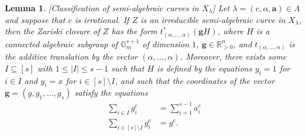 \documentclass[9pt]{amsart}
\theoremstyle{my_theorem_style}
\numberwithin{definition}{section}
\newtheorem{lemma}[definition]{Lemma}
\newcommand{\G}{\mathbb{G}}
\newcommand{\R}{\mathbb{R}}
\renewcommand{\vec}[1]{\bm{#1}}
\begin{document}
\begin{lemma}
\label{lemma/classification_of_semi-algebraic_curves}
    [Classification of semi-algebraic curves in $X_\lambda$]
    Let $\lambda = (c, \alpha, \vec{a}) \in \Lambda$ and suppose that $c$ is irrational. If $Z$ is an irreducible semi-algebraic curve in $X_\lambda$, then the Zariski closure of $Z$ has the form $t_{(\alpha, \dots, \alpha)}^*(\vec{g} H)$, where $H$ is a connected algebraic subgroup of $\G_m^{s + 1}$ of dimension $1$, $\vec{g} \in \R_{>0}^n$, and $t_{(\alpha, \dots, \alpha)}$ is the additive translation by the vector $(\alpha, \dots, \alpha)$. Moreover, there exists some $I \subseteq [s]$ with $1 \leq |I| \leq s - 1$ such that $H$ is defined by the equations $y_i = 1$ for $i \in I$ and $y_i = x$ for $i \in [s] \setminus I$, and such that the coordinates of the vector $\vec{g} = (g, g_1, \dots, g_s)$ satisfy the equations
    \begin{align*}
        \sum_{i \in I} g_i^c &= \sum_{i = 1}^{s - 1} a_i^c
        \\
        \sum_{i \in [s] \setminus I}
        g_i^c &= g^c.
    \end{align*}
\end{lemma}
\end{document}

